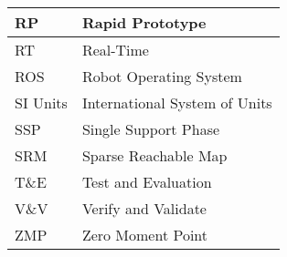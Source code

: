 \begin{center}
\begin{longtable}{l | l}
\hline
RP & Rapid Prototype\\
\hline
RT & Real-Time\\
\hline
ROS & Robot Operating System\\
\hline
SI Units & International System of Units\\
\hline
SSP & Single Support Phase\\
\hline
SRM & Sparse Reachable Map \\
\hline
T\&E & Test and Evaluation\\
\hline
V\&V & Verify and Validate \\
\hline 
ZMP & Zero Moment Point\\
\hline
\end{longtable}
\end{center}
